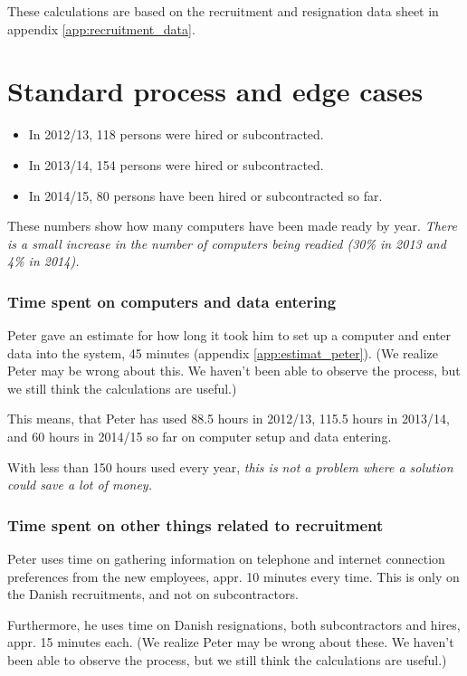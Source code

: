 \label{app:cost_benefit_analysis}
These calculations are based on the recruitment and resignation data sheet in appendix \ref{app:recruitment_data}.

\section{Standard process and edge cases}
\begin{itemize}
\item In 2012/13, 118 persons were hired or subcontracted.
\item In 2013/14, 154 persons were hired or subcontracted.
\item In 2014/15, 80 persons have been hired or subcontracted so far.
\end{itemize}
These numbers show how many computers have been made ready by year.
\emph{There is a small increase in the number of computers being readied (30\% in 2013 and 4\% in 2014).}

\subsubsection{Time spent on computers and data entering}
Peter gave an estimate for how long it took him to set up a computer and enter data into the system, 45 minutes (appendix \ref{app:estimat_peter}). (We realize Peter may be wrong about this. We haven't been able to observe the process, but we still think the calculations are useful.)

This means, that Peter has used 88.5 hours in 2012/13, 115.5 hours in 2013/14, and 60 hours in 2014/15 so far on computer setup and data entering.

With less than 150 hours used every year, \emph{this is not a problem where a solution could save a lot of money.}

\subsubsection{Time spent on other things related to recruitment}
Peter uses time on gathering information on telephone and internet connection preferences from the new employees, appr. 10 minutes every time.
This is only on the Danish recruitments, and not on subcontractors.

Furthermore, he uses time on Danish resignations, both subcontractors and hires, appr. 15 minutes each.
(We realize Peter may be wrong about these. We haven't been able to observe the process, but we still think the calculations are useful.)

